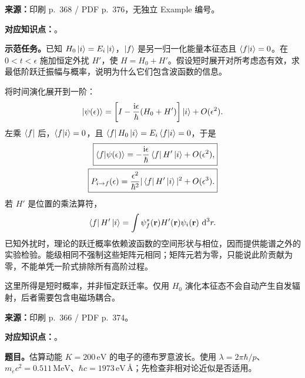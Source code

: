 \textbf{来源：}印刷 p.~368 / PDF p.~376，无独立 Example 编号。

\textbf{对应知识点：}。

\textbf{示范任务。}已知 $H_0\left|i\right\rangle=E_i\left|i\right\rangle$，$\left|f\right\rangle$ 是另一归一化能量本征态且 $\left\langle f \middle| i \right\rangle=0$。在 $0<t<\epsilon$ 施加恒定外扰 $H'$，使 $H=H_0+H'$。假设短时展开对所考虑态有效，求最低阶跃迁振幅与概率，说明为什么它们包含波函数的信息。

\begin{checkedsolution}
将时间演化展开到一阶：
\begin{equation}
  \left|\psi(\epsilon)\right\rangle
  =\left[I-\frac{\mathrm{i}\epsilon}{\hbar}(H_0+H')\right]\left|i\right\rangle
    +O(\epsilon^2).
\end{equation}
左乘 $\left\langle f\right|$ 后，$\left\langle f \middle| i \right\rangle=0$，且 $\left\langle f\right|H_0\left|i\right\rangle=E_i\left\langle f \middle| i \right\rangle=0$，于是
\begin{align}
  \boxed{\left\langle f \middle| \psi(\epsilon) \right\rangle
      =-\frac{\mathrm{i}\epsilon}{\hbar}\left\langle f\right|H'\left|i\right\rangle+O(\epsilon^2),}\\
  \boxed{P_{i\to f}(\epsilon)
      =\frac{\epsilon^2}{\hbar^2}|\left\langle f\right|H'\left|i\right\rangle|^2+O(\epsilon^3).}
\end{align}
若 $H'$ 是位置的乘法算符，
\begin{equation}
  \left\langle f\right|H'\left|i\right\rangle
    =\int\psi_f^*(\mathbf r)H'(\mathbf r)\psi_i(\mathbf r)\,\mathop{}\!\mathrm{d}^3r.
\end{equation}
已知外扰时，理论的跃迁概率依赖波函数的空间形状与相位，因而提供能谱之外的实验检验。能级相同不强制这些矩阵元相同；矩阵元若为零，只能说此阶贡献为零，不能单凭一阶式排除所有高阶过程。

这里所得是短时概率，并非恒定跃迁率。仅用 $H_0$ 演化本征态不会自动产生自发辐射，后者需要包含电磁场耦合。
\end{checkedsolution}

\textbf{来源：}印刷 p.~366 / PDF p.~374。

\textbf{对应知识点：}。

\textbf{题目。}估算动能 $K=200\,\mathrm{eV}$ 的电子的德布罗意波长。使用 $\lambda=2\pi\hbar/p$、$m_ec^2=0.511\,\mathrm{MeV}$、$\hbar c=1973\,\mathrm{eV}\,\text{\AA}$；先检查非相对论近似是否适用。

